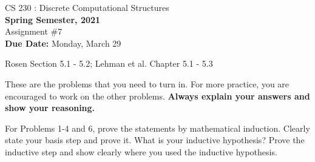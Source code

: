 \setlength{\oddsidemargin}{12pt}
\setlength{\textwidth}{6.5in}
\setlength{\textheight}{9in}
\pagestyle{empty}
\setlength{\parskip}{7pt plus 2pt minus 2pt}



    \begin{center}
    {{\large CS 230 : Discrete Computational Structures}}
        \\


        {\bf Spring Semester, 2021}\\

        {\sc Assignment \#7}\\
        {\bf Due Date:} Monday, March 29
    \end{center}

     Rosen Section 5.1 - 5.2; Lehman et al. Chapter 5.1 - 5.3

    These are the problems that you need to turn in. For more
    practice, you are encouraged to work on the other problems. {\bf Always
    explain your answers and show your reasoning.}

    For Problems 1-4 and 6, prove the statements by mathematical induction. Clearly state your basis step and prove it. What is your inductive hypothesis? Prove the inductive step and show clearly where you used the inductive hypothesis.

